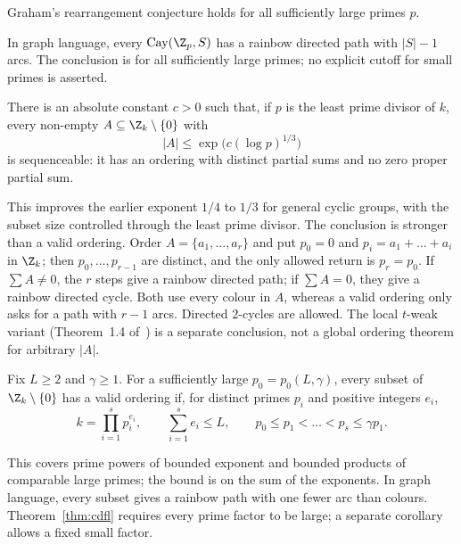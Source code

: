 \begin{theorem}\label{thm:graham-large}
Graham's rearrangement conjecture holds for all sufficiently large primes $p$.
\end{theorem}

In graph language, every $\operatorname{Cay}(\Z_p,S)$ has a rainbow directed path with $|S|-1$ arcs. The conclusion is for all sufficiently large primes; no explicit cutoff for small primes is asserted.


\begin{theorem}\label{thm:cdf}
There is an absolute constant $c>0$ such that, if $p$ is the least prime divisor of $k$, every non-empty $A\subseteq\Z_k\setminus\{0\}$ with
\[
|A|\leq\exp\bigl(c(\log p)^{1/3}\bigr)
\]
is sequenceable: it has an ordering with distinct partial sums and no zero proper partial sum.
\end{theorem}

This improves the earlier exponent $1/4$ to $1/3$ for general cyclic groups, with the subset size controlled through the least prime divisor. The conclusion is stronger than a valid ordering. Order $A=\{a_1,\dots,a_r\}$ and put $p_0=0$ and $p_i=a_1+\dots+a_i$ in $\Z_k$; then $p_0,\dots,p_{r-1}$ are distinct, and the only allowed return is $p_r=p_0$. If $\sum A\neq0$, the $r$ steps give a rainbow directed path; if $\sum A=0$, they give a rainbow directed cycle. Both use every colour in $A$, whereas a valid ordering only asks for a path with $r-1$ arcs. Directed $2$-cycles are allowed. The local $t$-weak variant (Theorem~1.4 of~\cite{cdf26}) is a separate conclusion, not a global ordering theorem for arbitrary $|A|$.


\begin{theorem}\label{thm:cdfl}
Fix $L\geq2$ and $\gamma\geq1$. For a sufficiently large $p_0=p_0(L,\gamma)$, every subset of $\Z_k\setminus\{0\}$ has a valid ordering if, for distinct primes $p_i$ and positive integers $e_i$,
\[
k=\prod_{i=1}^{s}p_i^{e_i},\qquad\sum_{i=1}^{s}e_i\leq L,\qquad p_0\leq p_1<\dots<p_s\leq\gamma p_1 .
\]
\end{theorem}

This covers prime powers of bounded exponent and bounded products of comparable large primes; the bound is on the sum of the exponents. In graph language, every subset gives a rainbow path with one fewer arc than colours. Theorem~\ref{thm:cdfl} requires every prime factor to be large; a separate corollary allows a fixed small factor.

